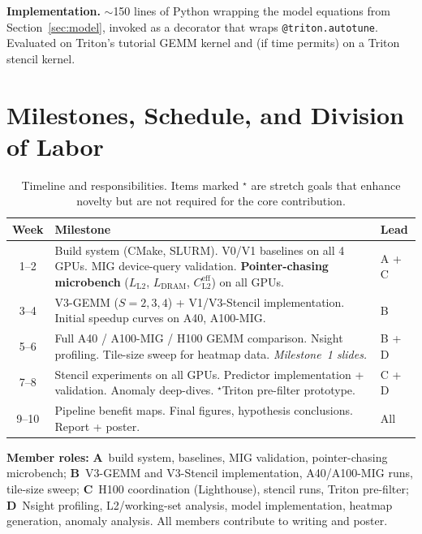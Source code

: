 \documentclass[sigplan,nonacm,10pt]{acmart}
\begin{document}
\textbf{Implementation.}
$\sim$150 lines of Python wrapping the model equations from
Section~\ref{sec:model}, invoked as a decorator that wraps
\texttt{@triton.autotune}.
Evaluated on Triton's tutorial GEMM kernel and (if time permits) on
a Triton stencil kernel.

\section{Milestones, Schedule, and Division of Labor}
\label{sec:plan}

\begin{table}[t]
\centering
\small
\caption{Timeline and responsibilities.  Items marked ${}^\star$ are
stretch goals that enhance novelty but are not required for the core
contribution.}
\label{tab:plan}
\begin{tabular}{@{}cp{5.2cm}l@{}}
\toprule
\textbf{Week} & \textbf{Milestone} & \textbf{Lead} \\
\midrule
1--2 & Build system (CMake, SLURM).
       V0/V1 baselines on all 4 GPUs.
       MIG device-query validation.
       \textbf{Pointer-chasing microbench}
       ($L_{\text{L2}}$, $L_{\text{DRAM}}$,
       $C_{\text{L2}}^{\text{eff}}$) on all GPUs.
     & A + C \\
3--4 & V3-GEMM ($S = 2,3,4$) + V1/V3-Stencil
       implementation.
       Initial speedup curves on A40, A100-MIG.
     & B \\
5--6 & Full A40 / A100-MIG / H100 GEMM comparison.
       Nsight profiling.
       Tile-size sweep for heatmap data.
       \textit{Milestone~1 slides.}
     & B + D \\
7--8 & Stencil experiments on all GPUs.
       Predictor implementation + validation.
       Anomaly deep-dives.
       ${}^\star$Triton pre-filter prototype.
     & C + D \\
9--10 & Pipeline benefit maps.
       Final figures, hypothesis conclusions.
       Report + poster.
     & All \\
\bottomrule
\end{tabular}
\end{table}

\noindent\textbf{Member roles:}
\textbf{A}~build system, baselines, MIG validation, pointer-chasing
microbench;
\textbf{B}~V3-GEMM and V3-Stencil implementation, A40/A100-MIG runs,
tile-size sweep;
\textbf{C}~H100 coordination (Lighthouse), stencil runs,
Triton pre-filter;
\textbf{D}~Nsight profiling, L2/working-set analysis, model
implementation, heatmap generation, anomaly analysis.
All members contribute to writing and poster.
\end{document}
